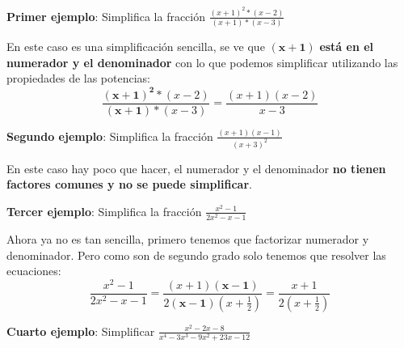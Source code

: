 \documentclass[a4paper,11pt,answers]{exam}
\begin{document}
\textbf{Primer ejemplo}: Simplifica la fracción $\frac{(x+1)^2 *(x-2)}{(x+1)*(x-3)}$
\begin{solution}
  En este caso es una simplificación sencilla, se ve que $\boldsymbol{(x+1)}$ \textbf{está en el numerador y el denominador} con lo que podemos simplificar utilizando las propiedades de las potencias:
  \[\frac{\boldsymbol{(x+1)^2} *(x-2)}{\boldsymbol{(x+1)}*(x-3)} = \frac{(x+1)(x-2)}{x-3}\]
\end{solution}
\vspace{1cm}
\textbf{Segundo ejemplo}: Simplifica la fracción $\frac{(x+1)(x-1)}{(x+3)^2}$
\begin{solution}
  En este caso hay poco que hacer, el numerador y el denominador \textbf{no tienen factores comunes y no se puede simplificar}.
\end{solution}
\vspace{1cm}
\textbf{Tercer ejemplo}: Simplifica la fracción $\frac{x^2 - 1}{2x^2 - x - 1}$
\begin{solution}
  Ahora ya no es tan sencilla, primero tenemos que factorizar numerador y denominador. Pero como son de segundo grado solo tenemos que resolver las ecuaciones:
  \[\frac{x^2 - 1}{2x^2 - x - 1} = \frac{(x+1)\boldsymbol{(x-1)}}{2\boldsymbol{(x-1)}\left(x+\frac{1}{2}\right)}
  = \frac{x+1}{2\left(x+\frac{1}{2}\right)}\]
\end{solution}
\vspace{1cm}
\textbf{Cuarto ejemplo}: Simplificar $\frac{x^2 - 2x -8}{x^4-3x^3-9x^2+23x-12}$
\end{document}
